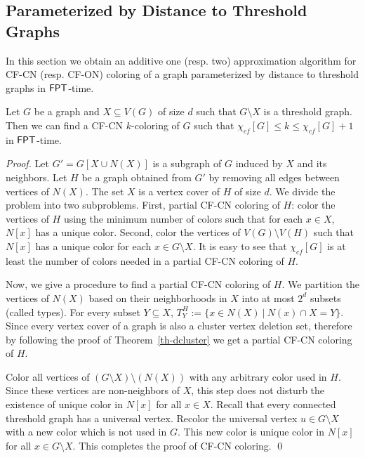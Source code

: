 \documentclass[svgnames]{llncs}
\newcommand{\fpt}{\ensuremath{\sf{FPT}}\xspace}
\newcommand{\cfcn}{\textsc {CF-CN}}
\newcommand{\cfon}{\textsc {CF-ON}}
\begin{document}
\subsection{Parameterized by Distance to Threshold Graphs}
In this section we obtain an additive one (resp. two) approximation algorithm for \cfcn{} (resp. \cfon{}) coloring of a graph parameterized by distance to threshold graphs in $\fpt$-time. 
\begin{theorem}\label{th-threshold}
Let $G$ be a graph and $X \subseteq V(G)$ of size $d$ such that $G \setminus X$ is a threshold graph. Then we can find a \cfcn{} $k$-coloring of $G$ such that  $\chi_{cf}[G] \leq k \leq \chi_{cf}[G]+1$ in $\fpt$-time.
\end{theorem}
\begin{proof}
Let $G'=G[X \cup N(X)]$ is a subgraph of $G$ induced by $X$ and its neighbors. Let $H$ be a graph obtained from 
$G'$ by removing all edges between vertices of $N(X)$. The set $X$ is a vertex cover of $H$ of size $d$.
We divide the problem into two subproblems. First, partial \cfcn{} coloring of $H$: color the vertices of $H$ using the minimum number of colors such that for each $x \in X$, $N[x]$ has a unique color.
Second, color the vertices of $V(G) \setminus V(H)$ such that $N[x]$ has a unique color for each $x \in G \setminus X$.
It is easy to see that $\chi_{cf}[G]$ is at least the number of colors needed in a partial \cfcn{} coloring of $H$.

Now, we give a procedure to find a partial \cfcn{} coloring of $H$. 
We partition the vertices of $N(X)$ based on their neighborhoods in $X$ into at most $2^{d}$ subsets (called types).
For every subset $Y \subseteq X$, $T_Y^H:=\{x \in N(X) ~|~ N(x) \cap X=Y\}$. 
Since every vertex cover of a graph is also a cluster vertex deletion set, therefore
by following the proof of Theorem~\ref{th-dcluster} we get a partial \cfcn{} coloring of $H$. 

Color all vertices of $(G \setminus X) \setminus (N(X))$ with any arbitrary color used in $H$. Since these vertices are 
non-neighbors of $X$, this step does not disturb the existence of unique color in $N[x]$ for all $x \in X$. 
Recall that every connected threshold graph has a universal vertex. 
Recolor the universal vertex $u \in G \setminus X$ with a new color which is not used in $G$. This new color is unique color in 
$N[x]$ for all $x \in G \setminus X$. This completes the proof of \cfcn{} coloring. \qed
\end{proof}
\end{document}
